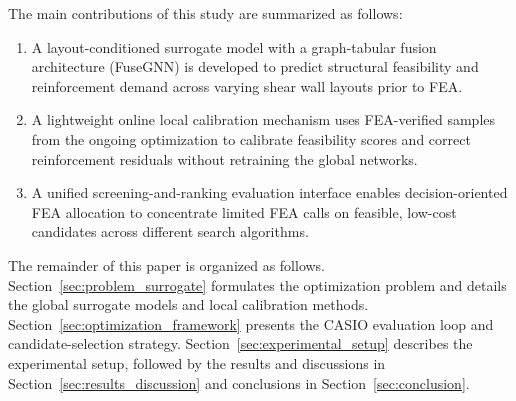 The main contributions of this study are summarized as follows:
\begin{enumerate}[(1)]
\item A layout-conditioned surrogate model with a graph-tabular fusion architecture (FuseGNN) is developed to predict structural feasibility and reinforcement demand across varying shear wall layouts prior to FEA.

\item A lightweight online local calibration mechanism uses FEA-verified samples from the ongoing optimization to calibrate feasibility scores and correct reinforcement residuals without retraining the global networks.

\item A unified screening-and-ranking evaluation interface enables decision-oriented FEA allocation to concentrate limited FEA calls on feasible, low-cost candidates across different search algorithms.
\end{enumerate}

The remainder of this paper is organized as follows. Section~\ref{sec:problem_surrogate} formulates the optimization problem and details the global surrogate models and local calibration methods. Section~\ref{sec:optimization_framework} presents the CASIO evaluation loop and candidate-selection strategy. Section~\ref{sec:experimental_setup} describes the experimental setup, followed by the results and discussions in Section~\ref{sec:results_discussion} and conclusions in Section~\ref{sec:conclusion}.